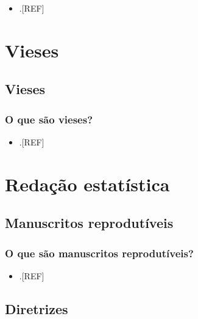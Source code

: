 \documentclass[
]{book}
\providecommand{\tightlist}{%
  \setlength{\itemsep}{0pt}\setlength{\parskip}{0pt}}
\begin{document}
\begin{itemize}
\tightlist
\item
  .{[}REF{]}
\end{itemize}

\hypertarget{vieses}{%
\chapter{\texorpdfstring{\textbf{Vieses}}{Vieses}}\label{vieses}}

\hypertarget{vieses}{%
\section{Vieses}\label{vieses}}

\hypertarget{o-que-suxe3o-vieses}{%
\subsection{O que são vieses?}\label{o-que-suxe3o-vieses}}

\begin{itemize}
\tightlist
\item
  .{[}REF{]}
\end{itemize}

\hypertarget{redacao}{%
\chapter{\texorpdfstring{\textbf{Redação estatística}}{Redação estatística}}\label{redacao}}

\hypertarget{manuscritos-reprodutiveis}{%
\section{Manuscritos reprodutíveis}\label{manuscritos-reprodutiveis}}

\hypertarget{o-que-suxe3o-manuscritos-reprodutuxedveis}{%
\subsection{O que são manuscritos reprodutíveis?}\label{o-que-suxe3o-manuscritos-reprodutuxedveis}}

\begin{itemize}
\tightlist
\item
  .{[}REF{]}
\end{itemize}

\hypertarget{diretrizes}{%
\section{Diretrizes}\label{diretrizes}}
\end{document}
